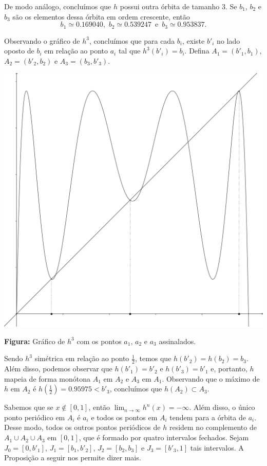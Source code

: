 De modo análogo, concluímos que $h$ possui outra órbita de tamanho $3$. Se $b_1$, $b_2$ e $b_3$ são os elementos dessa órbita em ordem crescente, então
$$b_1 \simeq 0.169040 \text{, } \, b_2 \simeq 0.539247 \,  \text{ e } \, b_3 \simeq 0.953837.$$

Observando o gráfico de $h^3$, concluímos que para cada $b_i$, existe $b'_i$ no lado oposto de $b_i$ em relação ao ponto $a_i$ tal que $h^3(b'_i) = b_i$. Defina $A_1 = (b'_1, b_1)$, $A_2 = (b'_2, b_2)$ e $A_3 = (b_3, b'_3)$.

\begin{center}
\includegraphics[scale=0.15]{images/matriz-de-transicao-1.png}

{\small \textbf{Figura:} Gráfico de $h^3$ com os pontos $a_1$, $a_2$ e $a_3$ assinalados.}
\end{center}

Sendo $h^3$ simétrica em relação ao ponto $\frac{1}{2}$, temos que $h(b'_2) = h(b_2) = b_3$.
Além disso, podemos observar que $h(b'_1) = b'_2$ e $h(b'_3) = b'_1$ e, portanto, $h$ mapeia de forma monótona $A_1$ em $A_2$ e $A_3$ em $A_1$. Observando que o máximo de $h$ em $A_2$ é $h( \frac{1}{2}) = 0.95975 < b'_3$, concluímos que $h(A_2) \subset A_3$.

Sabemos que se $x \notin [0, 1]$, então $\lim_{n \to \infty} h^n(x) = -\infty$.
Além disso, o único ponto periódico em $A_i$ é $a_i$ e todos os pontos em $A_i$ tendem para a órbita de $a_i$.
Desse modo, todos os outros pontos periódicos de $h$ residem no complemento de $A_1 \cup A_2 \cup A_3$ em $[0, 1]$, que é formado por quatro intervalos fechados. Sejam $J_0 = [0, b'_1]$, $J_1 = [b_1, b'_2]$, $J_2 = [b_2, b_3]$ e $J_3 = [b'_3, 1]$ tais intervalos. A Proposição a seguir nos permite dizer mais.

